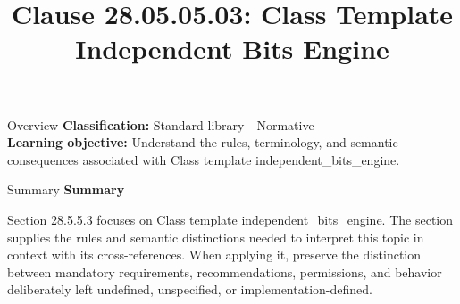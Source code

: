 \documentclass[10pt,letterpaper]{article}
\title{Clause 28.05.05.03: Class Template Independent Bits Engine}
\author{}
\date{}
\begin{document}
\maketitle
\begin{CornellOverviewBox}{Overview}
\textbf{Classification:} Standard library - Normative\\[2pt]
\textbf{Learning objective:} Understand the rules, terminology, and semantic consequences associated with Class template independent\_bits\_engine.
\end{CornellOverviewBox}\begin{CornellSummaryBox}{Summary}
{\sffamily\bfseries\color{Accent} Summary}\par\vspace{3pt}Section 28.5.5.3 focuses on Class template independent\_bits\_engine. The section supplies the rules and semantic distinctions needed to interpret this topic in context with its cross-references. When applying it, preserve the distinction between mandatory requirements, recommendations, permissions, and behavior deliberately left undefined, unspecified, or implementation-defined.
\end{CornellSummaryBox}
\end{document}
